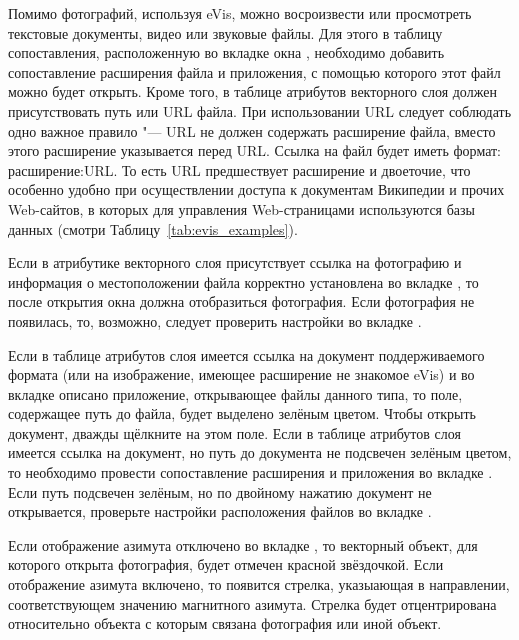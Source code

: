 \label{evis_location}

Помимо фотографий, используя eVis, можно восроизвести или просмотреть
текстовые документы, видео или звуковые файлы. Для этого в таблицу
сопоставления, расположенную во вкладке  окна
, необходимо добавить сопоставление расширения
файла и приложения, с помощью которого этот файл можно будет открыть. Кроме
того, в таблице атрибутов векторного слоя должен присутствовать путь или URL
файла. При использовании URL следует соблюдать одно важное правило "--- URL
не должен содержать расширение файла, вместо этого расширение указывается
перед URL. Ссылка на файл будет иметь формат: расширение:URL. То есть URL
предшествует расширение и двоеточие, что особенно удобно при осуществлении
доступа к документам Википедии и прочих Web-сайтов, в которых для управления
Web-страницами используются базы данных (смотри Таблицу~\ref{tab:evis_examples}).

\label{evis_using_browser}

Если в атрибутике векторного слоя присутствует ссылка на фотографию и
информация о местоположении файла корректно установлена во вкладке
, то после открытия окна  должна
отобразиться фотография. Если фотография не появилась, то, возможно,
следует проверить настройки во вкладке .

Если в таблице атрибутов слоя имеется ссылка на документ поддерживаемого
формата (или на изображение, имеющее расширение не знакомое eVis) и во
вкладке  описано приложение, открывающее файлы
данного типа, то поле, содержащее путь до файла, будет выделено зелёным
цветом. Чтобы открыть документ, дважды щёлкните на этом поле. Если в
таблице атрибутов слоя имеется ссылка на документ, но путь до документа
не подсвечен зелёным цветом, то необходимо провести сопоставление расширения
и приложения во вкладке . Если путь подсвечен
зелёным, но по двойному нажатию документ не открывается, проверьте
настройки расположения файлов во вкладке .

Если отображение азимута отключено во вкладке , то векторный
объект, для которого открыта фотография, будет отмечен красной звёздочкой.
Если отображение азимута включено, то появится стрелка, указыающая в
направлении, соответствующем значению магнитного азимута. Стрелка будет
отцентрирована относительно объекта с которым связана фотография или иной объект.

